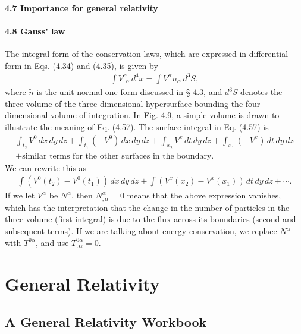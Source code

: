 \documentclass[11pt,letterpaper]{book}
\begin{document}
    \subsection{4.7 Importance for general relativity}
    
    \subsection{4.8 Gauss' law}

    The integral form of the conservation laws, which are expressed in differential form in Eqs. (4.34) and (4.35), is given by
    \begin{align}
    \int V^\alpha_{,\alpha} \, d^4x = \int V^\alpha n_\alpha \, d^3 S, \tag{4.57}
    \end{align}
    where \(\tilde{n}\) is the unit-normal one-form discussed in § 4.3, and \(d^3 S\) denotes the three-volume of the three-dimensional hypersurface bounding the four-dimensional volume of integration. In Fig. 4.9, a simple volume is drawn to illustrate the meaning of Eq. (4.57). The surface integral in Eq. (4.57) is
    \begin{align}
    \int_{t_2} V^0 \, dx \, dy \, dz + \int_{t_1} (-V^0) \, dx \, dy \, dz + \int_{x_2} V^x \, dt \, dy \, dz + \int_{x_1} (-V^x) \, dt \, dy \, dz
    \\
    + \text{similar terms for the other surfaces in the boundary}.
    \end{align}
    We can rewrite this as
    \begin{align}
    \int \left( V^0(t_2) - V^0(t_1) \right) \, dx \, dy \, dz + \int \left( V^x(x_2) - V^x(x_1) \right) \, dt \, dy \, dz + \cdots. \tag{4.58}
    \end{align}
    If we let \(V^\alpha\) be \(N^\alpha\), then \(N^\alpha_{,\alpha} = 0\) means that the above expression vanishes, which has the interpretation that the change in the number of particles in the three-volume (first integral) is due to the flux across its boundaries (second and subsequent terms). If we are talking about energy conservation, we replace \(N^\alpha\) with \(T^{0\alpha}\), and use \(T^{0\alpha}_{,\alpha} = 0\).
    
    
\part{General Relativity}



\chapter{A General Relativity Workbook}
\end{document}
